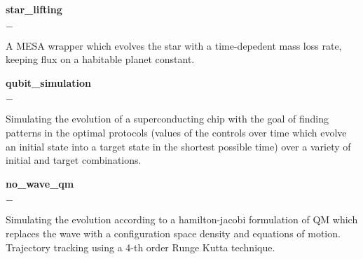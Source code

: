 \documentclass[]{scoggins-cv} %
\begin{document}
\begin{entrylist}

    \entry
    {\textbf{star\_lifting}}
    {}
    {}
    {%
        \vspace{-1em}
        \begin{list}{{\color{numcolor}$-$}}{\cvlist}
            \item A MESA wrapper which evolves the star with a time-depedent mass loss rate, keeping flux on a habitable planet constant.
        \end{list}
    }

    \entry
    {\textbf{qubit\_simulation}}
    {}
    {}
    {%
        \vspace{-1em}
        \begin{list}{{\color{numcolor}$-$}}{\cvlist}
            \item Simulating the evolution of a superconducting chip with the goal of finding patterns in the optimal protocols (values of the controls over time which evolve an initial state into a target state in the shortest possible time) over a variety of initial and target combinations.
        \end{list}
    }


    \entry
    {\textbf{no\_wave\_qm}}
    {}
    {}
    {%
        \vspace{-1em}
        \begin{list}{{\color{numcolor}$-$}}{\cvlist}
            \item Simulating the evolution according to a hamilton-jacobi formulation of QM which replaces the wave with a configuration space density and equations of motion. Trajectory tracking using a 4-th order Runge Kutta technique.
        \end{list}
    }



\end{entrylist}
\iffalse
\vspace{-0.5cm}
\end{document}
